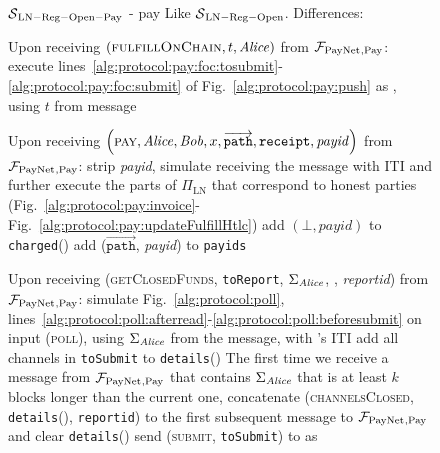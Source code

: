 \begin{figure}[H]
  \begin{simulatorbox}{$\mathcal{S}{}_{\mathrm{LN - Reg - Open - Pay}}$ - pay}
    Like $\mathcal{S}{}_{\mathrm{LN - Reg - Open}}$. Differences:
    \begin{algorithmic}[1]
      \State Upon receiving $\left(\textsc{fulfillOnChain}, t, \mathit{Alice}\right)$
      from $\mathcal{F}_{\mathrm{PayNet}}{}_{\mathrm{, Pay}}$:
      \label{alg:sim:pay:foc:top}
      \Indent
        \State execute
        lines~\ref{alg:protocol:pay:foc:tosubmit}-\ref{alg:protocol:pay:foc:submit}
        of Fig.~\ref{alg:protocol:pay:push} as \alice{}, using $t$ from message
        \label{alg:sim:pay:foc:run}
      \EndIndent
      \Statex

      \State Upon receiving $\left(\textsc{pay}, \mathit{Alice}, \mathit{Bob}, x,
      \overrightarrow{\mathtt{path}}, \mathtt{receipt}, \mathit{payid}\right)$
      from $\mathcal{F}_{\mathrm{PayNet}}{}_{\mathrm{, Pay}}$:
      \Indent
        \State strip \textit{payid}, simulate receiving the message with
        \alice{} ITI and further execute the parts of $\Pi_{\mathrm{LN}}$ that
        correspond to honest parties (Fig.~\ref{alg:protocol:pay:invoice}-
        Fig.~\ref{alg:protocol:pay:updateFulfillHtlc})
        \label{alg:sim:pay:simulate}
         
          \State add $\left(\bot, \mathit{payid}\right)$ to
          \texttt{charged}(\alice)
        \Else
          \State add ($\overrightarrow{\mathtt{path}}$, \textit{payid}) to
          \texttt{payids}
        \EndIf
      \EndIndent
      \Statex

      \State Upon receiving (\textsc{getClosedFunds}, \texttt{toReport},
      $\Sigma_{\mathit{Alice}}$, \alice, \textit{reportid}) from $\mathcal{F}_{\mathrm{PayNet}}{}_{\mathrm{,
      Pay}}$:
      \Indent
        \State simulate Fig.~\ref{alg:protocol:poll},
        lines~\ref{alg:protocol:poll:afterread}-\ref{alg:protocol:poll:beforesubmit}
        on input (\textsc{poll}), using $\Sigma_{\mathit{Alice}}$ from the message, with
        \alice's ITI
        \State add all channels in \texttt{toSubmit} to \texttt{details}(\alice)
        \State The first time we receive a message from $\mathcal{F}_{\mathrm{PayNet}}{}_{\mathrm{,
        Pay}}$ that contains $\Sigma_{\mathit{Alice}}$ that is at least $k$ blocks
        longer than the current one, concatenate (\textsc{channelsClosed},
        \texttt{details}(\alice), \texttt{reportid}) to the first subsequent
        message to $\mathcal{F}_{\mathrm{PayNet}}{}_{\mathrm{, Pay}}$ and clear
        \texttt{details}(\alice)
        \State send (\textsc{submit}, \texttt{toSubmit}) to \ledger{} as \alice
      \EndIndent
      \Statex


\end{algorithmic}
\end{simulatorbox}
\end{figure}

